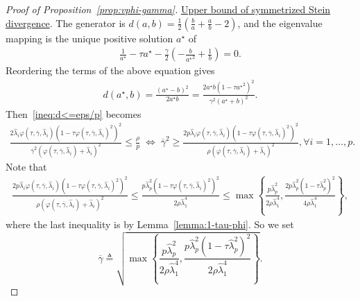 \documentclass[11pt]{article}
\newcommand{\opt}{^\star}
\newcommand{\Let}{\triangleq}
\newcommand{\wh}{\widehat}
\begin{document}
\begin{proof}[Proof of Proposition~\ref{prop:vphi-gamma}]
    \underline{Upper bound of symmetrized Stein divergence}. The generator is $d(a,b)=\frac{1}{2}\left(\frac{b}{a}+\frac{a}{b}-2\right)$, and the eigenvalue mapping is the unique positive solution $a\opt$ of 
    \begin{align*}\label{eq:def-SS-solution-mapping}
        \frac{1}{a\opt}-\tau a\opt -\frac{\gamma}{2}\left(-\frac{b}{{a\opt}^2}+\frac{1}{b}\right)=0.
    \end{align*}
    Reordering the terms of the above equation gives 
    \begin{align*}
        d(a\opt,b)=\frac{(a\opt-b)^2}{2a\opt b} = \frac{2a\opt b(1-\tau {a\opt}^2)^2}{\gamma^2(a\opt+b)^2}.
    \end{align*}
    Then~\eqref{ineq:d<=eps/p} becomes 
    \begin{align*}
        \frac{2\wh\lambda_i\varphi(\tau,\overline{\gamma},\wh\lambda_i)(1-\tau \varphi(\tau,\overline{\gamma},\wh\lambda_i)^2)^2}{\overline{\gamma}^2(\varphi(\tau,\overline{\gamma},\wh\lambda_i)+\wh\lambda_i)^2} \leq \frac{ \rho}{p} \;\Leftrightarrow \; \overline{\gamma}^2 \geq \frac{2p\wh\lambda_i\varphi(\tau,\overline{\gamma},\wh\lambda_i)(1-\tau \varphi(\tau,\overline{\gamma},\wh\lambda_i)^2)^2}{\rho(\varphi(\tau,\overline{\gamma},\wh\lambda_i)+\wh\lambda_i)^2}, 
        \forall i=1,\ldots,p.
    \end{align*}
    Note that 
    \begin{align*}
        \frac{2p\wh\lambda_i\varphi(\tau,\overline{\gamma},\wh\lambda_i)(1-\tau \varphi(\tau,\overline{\gamma},\wh\lambda_i)^2)^2}{\rho(\varphi(\tau,\overline{\gamma},\wh\lambda_i)+\wh\lambda_i)^2} \leq 
        \frac{p\wh\lambda_p^2(1-\tau \varphi(\tau,\overline{\gamma},\wh\lambda_i)^2)^2}{2 \rho \wh\lambda_1^4}\leq \max\left\{\frac{p\wh\lambda_p^2}{2 \rho \wh\lambda_1^4},\frac{2p\wh\lambda_p^2(1-\tau \wh\lambda_p^2)^2}{4 \rho \wh\lambda_1^4}\right\},
    \end{align*}
    where the last inequality is by Lemma~\ref{lemma:1-tau-phi}.
    So we set
    \[
        \overline{\gamma} \Let\sqrt{\max\left\{\frac{p\wh\lambda_p^2}{2 \rho \wh\lambda_1^4},\frac{p\wh\lambda_p^2(1-\tau \wh\lambda_p^2)^2}{2 \rho \wh\lambda_1^4}\right\}}.
    \]


\end{proof}
\end{document}
